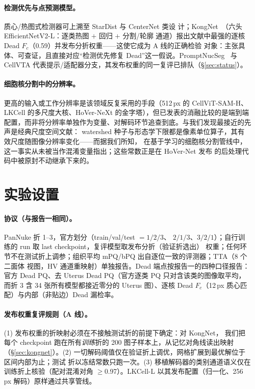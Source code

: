 \documentclass[11pt]{article}
\begin{document}
\paragraph{检测优先与点预测模型。}质心/热图式检测器可上溯至 StarDist 与 CenterNet 类设
计；KongNet~\cite{lv2025kongnet}（六头 EfficientNetV2-L：逐类热图 $+$ 回归 $+$ 分割/轮廓
通道）报出文献中最强的逐核 Dead $F_c$（0.59）并发布分折权重——这使它成为 A 线的正确检验
对象：主张具体、可查证，且直接对应“检测优先修复 Dead”这一假说。PromptNucSeg~\cite{promptnucseg}
与 CellVTA 代表提示/适配器分支，其发布权重的同一复评已排队（\S\ref{sec:status}）。

\paragraph{细胞核分割中的分辨率。}更高的输入或工作分辨率是该领域反复采用的手段（512\,px 的
CellViT-SAM-H、LKCell 的多尺度大核、HoVer-NeXt 的金字塔），但已发表的消融比较的是端到端
配置，而非将分辨率单独作为变量、对解码环节追查到底。与我们发现最接近的先声是经典尺度空间文献：
watershed 种子与形态学下限都是像素单位算子，其有效尺度随图像分辨率变化——而据我们所知，
在基于学习的细胞核分割管线中，这一事实从未被当作混淆变量指出；这些常数正是在 HoVer-Net 发布
的后处理代码中被原封不动继承下来的。

\section{实验设置}
\label{sec:setup}

\paragraph{协议（与报告一相同）。}PanNuke 折 1--3，官方划分（train/val/test $=1/2/3$、
$2/1/3$、$3/2/1$）；自行训练的 run 取 last checkpoint，复评模型取发布分折（验证折选出）
权重；任何环节不在测试折上调参；组织平均 mPQ/bPQ 出自逐位一致的评测器；TTA（8 个二面体
视图，HV 通道重映射）单独报告。Dead 端点按报告一的四种口径报告：官方 Dead PQ、去 Uterus
Dead PQ（官方逐类 PQ 只对含该类的图像取平均，而折 3 含 34 张所有模型都接近零分的 Uterus
图）、逐核 Dead $F_c$（12\,px 质心匹配）与内部（非贴边）Dead 漏检率。

\paragraph{发布权重复评规则（A 线）。}(1) 发布权重的折映射必须在不接触测试折的前提下确定：对 KongNet，
我们把每个 checkpoint 跑在所有\emph{训练}折的 200 图子样本上，从记忆对角线读出映射
（\S\ref{sec:kongnet}）。(2) 一切解码阈值仅在验证折上调优，网格扩展到最优解位于区间内部为止；测试
折以冻结常数只跑一次。(3) 移植解码器的类别通道语义仅在训练折上核验（配对混淆对角
$\geq$0.97）。LKCell-L 以其发布配置（归一化、256\,px 解码）原样通过共享管线。
\end{document}
